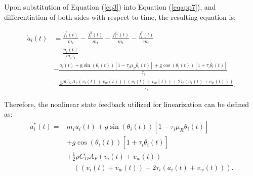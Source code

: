 \documentclass[a4paper]{cas-sc}
\begin{document}
Upon substitution of Equation (\ref{eq3}) into Equation (\ref{eqapp7}), and differentiation of both sides with respect to time, the resulting equation is:
\begin{small}
\begin{equation}
  \begin{aligned}
    \dot{a}_{l}(t) & =\frac{\dot{f}_{l}^{e}(t)}{m_{i}}-\frac{\dot{f}_{l}^{g}(t)}{m_{i}}-\frac{f_{l}^{i \omega}(t)}{m_{i}}-\frac{\dot{f}_{l}^{r}(t)}{m_{i}}                                                                                         \\
                   & =               \frac{u_{i}(t)}{m_{i} \tau_{i}}                                                                                                                                                                               \\
                   & -               \frac{a_{i}(t)+\mathrm{g} \sin \left(\theta_{i}(t)\right)\left[1-\tau_{i} \mu_{R} \dot{\theta}_{l}(t)\right]+\mathrm{g} \cos \left(\theta_{i}(t)\right)\left[1+\tau_{i} \dot{\theta}_{l}(t)\right]}{\tau_{i}} \\
                   & -               \frac{\frac{1}{2} \rho C_{D} A_{F}\left(v_{i}(t)+v_{w}(t)\right)\left(\left(v_{i}(t)+v_{w}(t)\right)+2 \tau_{i}\left(a_{i}(t)+\dot{v}_{w}(t)\right)\right)}{\tau_{i}}.
  \end{aligned}
  \label{eqapp8}
\end{equation}
\end{small}

Therefore, the nonlinear state feedback utilized for linearization can be defined as:
\begin{equation}
  \begin{aligned}
    u_i^\ast\left(t\right)= & m_iu_i\left(t\right)+g\sin{\left(\theta_i\left(t\right)\right)}\left[1-\tau_i\mu_R\dot{\theta_i}\left(t\right)\right]\\
    &+g\cos{\left(\theta_i\left(t\right)\right)}\left[1+\tau_i\dot{\theta_i}\left(t\right)\right]\ \\
                            & +\frac{1}{2}\rho C_DA_F\left(v_i\left(t\right)+v_w\left(t\right)\right)\\
                            &\quad \left(\left(v_i\left(t\right)+v_w\left(t\right)\right)+2\tau_i(a_i\left(t\right)+\dot{v_w}\left(t\right))\right).
  \end{aligned}
  \label{eqapp9}
\end{equation}
\end{document}
